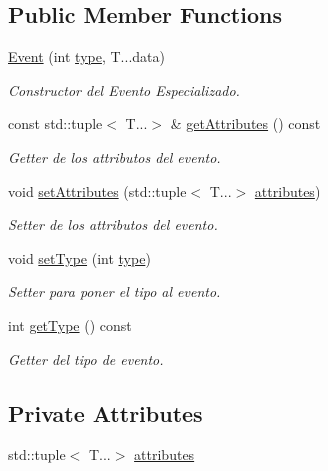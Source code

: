 \subsection*{Public Member Functions}
\begin{DoxyCompactItemize}
\item 
\hyperlink{classant_1_1_event_a5c93fd01dd1e5386716b691ecb66b0bc}{Event} (int \hyperlink{classant_1_1base_event_a432df0c459b20666e81c53ffab82caf4}{type}, T...\+data)
\begin{DoxyCompactList}\small\item\em Constructor del Evento Especializado. \end{DoxyCompactList}\item 
const std\+::tuple$<$ T...$>$ \& \hyperlink{classant_1_1_event_a120fa7dcb23ac66c2bb5bb15e7dcc4bf}{get\+Attributes} () const 
\begin{DoxyCompactList}\small\item\em Getter de los attributos del evento. \end{DoxyCompactList}\item 
void \hyperlink{classant_1_1_event_a47becb76c4999b7b446db567013e6259}{set\+Attributes} (std\+::tuple$<$ T...$>$ \hyperlink{classant_1_1_event_af66dcaa27ed84fbcaa880d80ec206a15}{attributes})
\begin{DoxyCompactList}\small\item\em Setter de los attributos del evento. \end{DoxyCompactList}\item 
void \hyperlink{classant_1_1base_event_a6d6f1170cb6f01301d137d732c0f2704}{set\+Type} (int \hyperlink{classant_1_1base_event_a432df0c459b20666e81c53ffab82caf4}{type})
\begin{DoxyCompactList}\small\item\em Setter para poner el tipo al evento. \end{DoxyCompactList}\item 
int \hyperlink{classant_1_1base_event_ad6672f6ff1522b7b66ff7ae43613ed71}{get\+Type} () const 
\begin{DoxyCompactList}\small\item\em Getter del tipo de evento. \end{DoxyCompactList}\end{DoxyCompactItemize}
\subsection*{Private Attributes}
\begin{DoxyCompactItemize}
\item 
std\+::tuple$<$ T...$>$ \hyperlink{classant_1_1_event_af66dcaa27ed84fbcaa880d80ec206a15}{attributes}
\end{DoxyCompactItemize}


